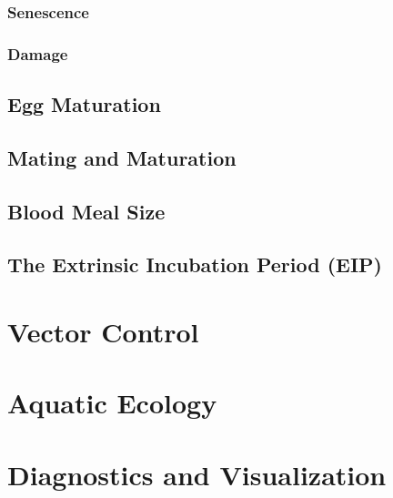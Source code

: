 \documentclass{article}
\begin{document}
\subsubsection{Senescence}

\subsubsection{Damage}

\subsection{Egg Maturation}

\subsection{Mating and Maturation}

\subsection{Blood Meal Size}

\subsection{The Extrinsic Incubation Period (EIP)}

\section{Vector Control}

\section{Aquatic Ecology}

\section{Diagnostics and Visualization}
\end{document}

